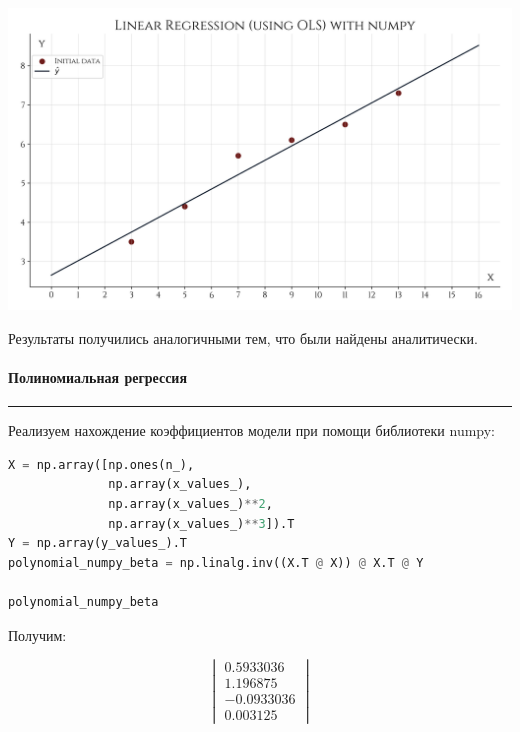 \documentclass[a4paper, 14pt]{extarticle}
\begin{document}
\begin{center}
    \includegraphics[width=1\textwidth, height=1\textheight, keepaspectratio]{Linear_Regression_numpy} \\
\end{center}

Результаты получились аналогичными тем, что были найдены аналитически.

\paragraph*{{Полиномиальная регрессия}}\vspace{-20pt}\rule{\linewidth}{0.1mm}

Реализуем нахождение коэффициентов модели при помощи библиотеки numpy:

\begin{center}
    \begin{lstlisting}[language=Python]
X = np.array([np.ones(n_), 
              np.array(x_values_), 
              np.array(x_values_)**2, 
              np.array(x_values_)**3]).T
Y = np.array(y_values_).T
polynomial_numpy_beta = np.linalg.inv((X.T @ X)) @ X.T @ Y

polynomial_numpy_beta
    \end{lstlisting}
\end{center}

Получим:

\begin{equation*}
    \begin{vmatrix}
        0.5933036 \\
        1.196875 \\
        -0.0933036 \\
        0.003125
    \end{vmatrix}
\end{equation*}
\end{document}
